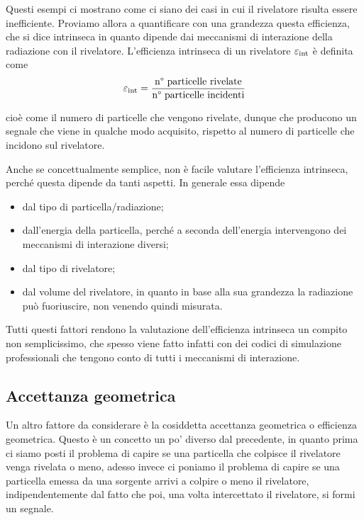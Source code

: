Questi esempi ci mostrano come ci siano dei casi in cui il rivelatore risulta essere inefficiente. Proviamo allora a quantificare con una grandezza questa efficienza, che si dice intrinseca in quanto dipende dai meccanismi di interazione della radiazione con il rivelatore. L'efficienza intrinseca di un rivelatore $\varepsilon_{\rm int}$ è definita come
\begin{equation*}
   \varepsilon_{\rm int}
   =\frac{\text{n° particelle rivelate}}{\text{n° particelle incidenti}}
\end{equation*}

cioè come il numero di particelle che vengono rivelate, dunque che producono un segnale che viene in qualche modo acquisito, rispetto al numero di particelle che incidono sul rivelatore.

Anche se concettualmente semplice, non è facile valutare l'efficienza intrinseca, perché questa dipende da tanti aspetti. In generale essa dipende
\begin{itemize}
   \item dal tipo di particella/radiazione;%
   \item dall'energia della particella, perché a seconda dell'energia intervengono dei meccanismi di interazione diversi;
   \item dal tipo di rivelatore;
   \item dal volume del rivelatore, in quanto in base alla sua grandezza la radiazione può fuoriuscire, non venendo quindi misurata.
\end{itemize}
Tutti questi fattori rendono la valutazione dell'efficienza intrinseca un compito non semplicissimo, che spesso viene fatto infatti con dei codici di simulazione professionali che tengono conto di tutti i meccanismi di interazione.
\subsection{Accettanza geometrica}
Un altro fattore da considerare è la cosiddetta accettanza geometrica o efficienza geometrica. Questo è un concetto un po' diverso dal precedente, in quanto prima ci siamo posti il problema di capire se una particella che colpisce il rivelatore venga rivelata o meno, adesso invece ci poniamo il problema di capire se una particella emessa da una sorgente arrivi a colpire o meno il rivelatore, indipendentemente dal fatto che poi, una volta intercettato il rivelatore, si formi un segnale.

